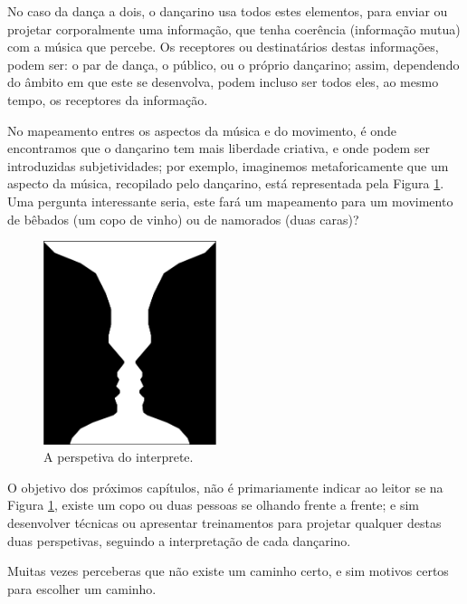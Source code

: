 No caso da dança a dois, o dançarino usa todos estes elementos, 
para enviar ou projetar corporalmente uma informação, que tenha coerência (informação mutua) com a música que percebe.
Os receptores ou destinatários destas informações, podem ser: o par de dança,
o público, ou o próprio dançarino; 
assim, dependendo do âmbito em que este se desenvolva,
podem incluso ser todos eles, ao mesmo tempo, os receptores da informação.

No mapeamento entres os aspectos da música e do movimento, 
é onde encontramos que o dançarino tem mais liberdade criativa, 
e onde podem ser introduzidas subjetividades; por exemplo,
imaginemos metaforicamente que um aspecto da música, recopilado pelo dançarino, 
está representada pela Figura \ref{fig:LaCopaDeRubin}.
Uma pergunta interessante seria, 
este fará um mapeamento para um  movimento de bêbados (um copo de vinho) ou de namorados (duas caras)?
\begin{figure}[!h]
  \centering
    \includegraphics[width=0.45\textwidth]{chapters/cap-musicalidade/LaCopaDeRubin.eps}
\caption{A perspetiva do interprete.}
\label{fig:LaCopaDeRubin}
\end{figure}

O objetivo dos próximos  capítulos, não é primariamente indicar ao leitor se na Figura \ref{fig:LaCopaDeRubin},
existe um copo ou duas pessoas se olhando frente a frente; e sim desenvolver técnicas ou 
apresentar treinamentos para projetar qualquer destas duas perspetivas, seguindo a interpretação de cada dançarino.

\begin{FraseFernandoPR}
Muitas vezes perceberas que não existe um caminho certo, 
e sim motivos certos para escolher um caminho.%
\end{FraseFernandoPR}

